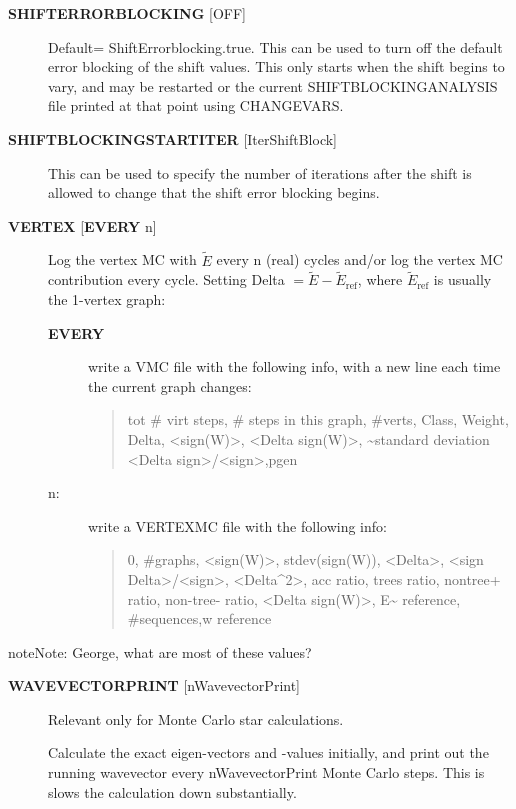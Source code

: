 \documentclass[openany,a4paper,10pt,english]{manual}
\begin{document}
\begin{description}
\item[\textbf{SHIFTERRORBLOCKING} {[}OFF{]}] \leavevmode
Default= ShiftErrorblocking.true.
This can be used to turn off the default error blocking of the shift values.
This only starts when the shift begins to vary, and may be restarted or the
current SHIFTBLOCKINGANALYSIS file printed at that point using CHANGEVARS.

\item[\textbf{SHIFTBLOCKINGSTARTITER} {[}IterShiftBlock{]}] \leavevmode
This can be used to specify the number of iterations after the shift is allowed
to change that the shift error blocking begins.

\item[\textbf{VERTEX} {[}\textbf{EVERY} n{]}] \leavevmode
Log the vertex MC with $\tilde{E}$ every n (real) cycles
and/or log the vertex MC contribution every cycle.  Setting
Delta $=\tilde{E}-\tilde{E}_{\textrm{ref}}$, where
$\tilde{E}_{\textrm{ref}}$ is usually the 1-vertex graph:
\begin{description}
\item[\textbf{EVERY}] \leavevmode
write a VMC file with the following info, with a new line each
time the current graph changes:
\begin{quote}

tot \# virt steps, \# steps in this graph, \#verts, Class, Weight, Delta, \textless{}sign(W)\textgreater{}, \textless{}Delta sign(W)\textgreater{}, \textasciitilde{}standard deviation \textless{}Delta sign\textgreater{}/\textless{}sign\textgreater{},pgen
\end{quote}

\item[n:] \leavevmode
write a VERTEXMC file with the following info:
\begin{quote}

0, \#graphs, \textless{}sign(W)\textgreater{}, stdev(sign(W)), \textless{}Delta\textgreater{}, \textless{}sign Delta\textgreater{}/\textless{}sign\textgreater{}, \textless{}Delta\textasciicircum{}2\textgreater{}, acc ratio, trees ratio, nontree+ ratio, non-tree- ratio, \textless{}Delta sign(W)\textgreater{}, E\textasciitilde{} reference, \#sequences,w reference
\end{quote}

\end{description}

\end{description}

\begin{notice}{note}{Note:}
George, what are most of these values?
\end{notice}
\begin{description}
\item[\textbf{WAVEVECTORPRINT} {[}nWavevectorPrint{]}] \leavevmode
Relevant only for Monte Carlo star calculations.

Calculate the exact eigen-vectors and -values initially, and
print out the running wavevector every nWavevectorPrint Monte Carlo
steps. This is slows the calculation down substantially.

\end{description}
\end{document}
